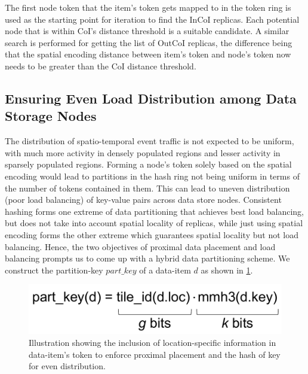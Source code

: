 The first node token that the item's token gets mapped to in the token ring is used as the starting point for iteration to find the InCoI replicas. Each potential node that is within CoI's distance threshold is a suitable candidate. A similar search is performed for getting the list of OutCoI replicas, the difference being that the spatial encoding distance between item's token and node's token now needs to be greater than the CoI distance threshold.

\subsection{Ensuring Even Load Distribution among Data Storage Nodes}
\par The distribution of spatio-temporal event traffic is not expected to be uniform, with much more activity in densely populated regions and lesser activity in sparsely populated regions. Forming a node's token solely based on the spatial encoding would lead to partitions in the hash ring not being uniform in terms of the number of tokens contained in them. This can lead to uneven distribution (poor load balancing) of key-value pairs across data store nodes. Consistent hashing forms one extreme of data partitioning that achieves best load balancing, but does not take into account spatial locality of replicas, while just using spatial encoding forms the other extreme which guarantees spatial locality but not load balancing.
Hence, the two objectives of proximal data placement and load balancing prompts us to come up with a hybrid data partitioning scheme. We construct the partition-key $part\_key$ of a data-item $d$ as shown in \cref{fig:partitionkey}.
\begin{figure}[h]
\centering
\includegraphics[width=0.75\columnwidth]{figures/fogstore/partition_key.pdf}
\caption{Illustration showing the inclusion of location-specific information in data-item's token to enforce proximal placement and the hash of key for even distribution.}
\label{fig:partitionkey}
\end{figure}

